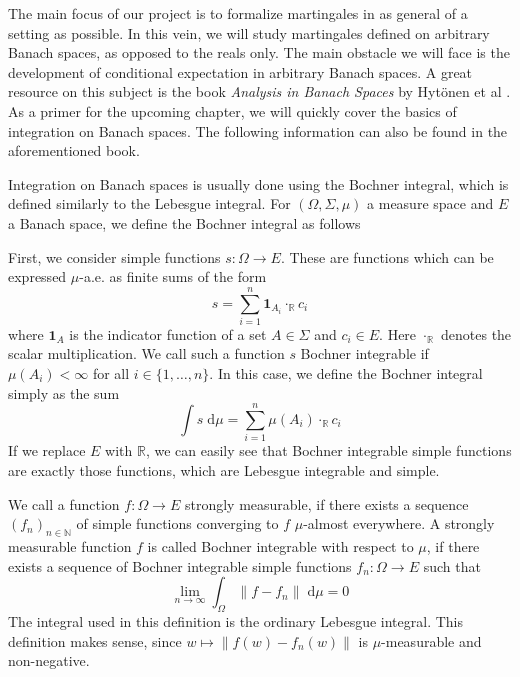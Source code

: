 The main focus of our project is to formalize martingales in as general of a setting as possible. In this vein, we will study martingales defined on arbitrary Banach spaces, as opposed to the reals only. The main obstacle we will face is the development of conditional expectation in arbitrary Banach spaces. A great resource on this subject is the book \textit{Analysis in Banach Spaces} by Hytönen et al \cite{Hytoenen_2016}. As a primer for the upcoming chapter, we will quickly cover the basics of integration on Banach spaces. The following information can also be found in the aforementioned book.

Integration on Banach spaces is usually done using the Bochner integral, which is defined similarly to the Lebesgue integral. For $(\Omega, \Sigma, \mu)$ a measure space and $E$ a Banach space, we define the Bochner integral as follows

\relax
{}\relax
\vspace{0.3cm}

First, we consider simple functions $s : \Omega \rightarrow E$. These are functions which can be expressed $\mu$-a.e. as finite sums of the form
\[
	s = \sum_{i=1}^n \mathbf{1}_{A_i} \cdot_\mathbb{R} c_i
\]
where $\mathbf{1}_A$ is the indicator function of a set $A \in \Sigma$ and $c_i \in E$. Here $\cdot_\mathbb{R}$ denotes the scalar multiplication. We call such a function $s$ Bochner integrable if $\mu(A_i) < \infty$ for all $i \in \{1,\dots,n\}$. In this case, we define the Bochner integral simply as the sum
\[
	\int s \; \textrm{d}\mu = \sum_{i=1}^n \mu(A_i) \cdot_\mathbb{R} c_i
\]
If we replace $E$ with $\mathbb{R}$, we can easily see that Bochner integrable simple functions are exactly those functions, which are Lebesgue integrable and simple.
\vspace{0.2cm}

We call a function $f : \Omega \rightarrow E$ strongly measurable, if there exists a sequence $(f_n)_{n\in\mathbb{N}}$ of simple functions converging to $f$ $\mu$-almost everywhere.
A strongly measurable function $f$ is called Bochner integrable with respect to $\mu$, if there exists a sequence of Bochner integrable simple functions $f_n : \Omega \rightarrow E$ such that
\[
	\lim_{n \to \infty} \int_\Omega \lVert f - f_n \rVert \; \textrm{d}\mu = 0
\]
The integral used in this definition is the ordinary Lebesgue integral. This definition makes sense, since $w \mapsto \lVert f(w) - f_n(w) \rVert$ is $\mu$-measurable and non-negative.

